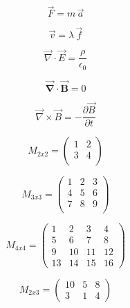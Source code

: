 \documentclass[12pt,a4paper, oneside]{book}
\begin{document}
\begin{equation}
\vec{F} = m\,\vec{a}
\end{equation}

\begin{equation}
\vec{v} = \lambda\,\vec{f}
\end{equation}

\begin{equation}
\vec{\nabla} \cdot \vec{E} = \frac{\rho}{\epsilon_{0}}
\end{equation}

\begin{equation}
\vec{\mathbf{\nabla}} \cdot \vec{\mathbf{B}} = 0
\end{equation}

\begin{equation}
\vec{\nabla} \times \vec{B} = -\frac{\partial \vec{B}}{\partial t}
\end{equation}

\begin{equation}
M_{2x2} = \left(
\begin{array}{lr}
    1 & 2 \\    
    3 & 4 \\
\end{array}
\right)
\end{equation}

\begin{equation}
M_{3x3} = \left(
\begin{array}{lcr}
    1 & 2 & 3 \\    
    4 & 5 & 6 \\
    7 & 8 & 9 \\
\end{array}
\right)
\end{equation}

\begin{equation}
M_{4x4} = \begin{pmatrix}
    1 & 2 & 3 & 4 \\
    5 & 6 & 7 & 8 \\
    9 & 10 & 11 & 12 \\
    13 & 14 & 15 & 16
\end{pmatrix}
\end{equation}

\begin{equation}
M_{2x3} = \begin{pmatrix}
    10 & 5 & 8 \\
    3 & 1 & 4 
\end{pmatrix}
\end{equation}
\end{document}
